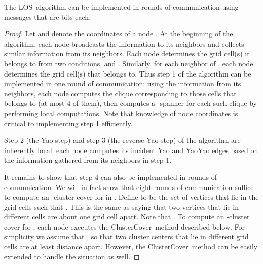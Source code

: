 \documentclass{llncs}
\newcommand{\alg}{{\sc LOS}}
\newcommand{\cc}{{\sc ClusterCover}}
\begin{document}
\begin{theorem}
The \alg\ algorithm can be implemented in  rounds of communication using messages that
are  bits each.
\label{thm:communication}
\end{theorem}
\begin{proof}
Let  and  denote the coordinates of a node . At the beginning of
the algorithm, each node  broadcasts the information 
to its neighbors and collects similar information from its neighbors.
Each node  determines the grid cell(s)  it belongs to from
two conditions, 
and
.
Similarly, for each neighbor  of , each node  determines the grid
cell(s) that  belongs to. Thus step 1 of the algorithm can be implemented
in one round of communication: using the information from its neighbors,
each node  computes the clique corresponding to those cells  that
 belongs to (at most 4 of them), then  computes a -spanner for each
such clique by performing local computations.
Note that knowledge of node coordinates is critical to implementing step 1
efficiently.

Step 2 (the Yao step) and step 3 (the reverse Yao step) of the algorithm
are inherently local: each node  computes its incident Yao and YaoYao
edges based on the information gathered from its neighbors in step 1.

It remains to show that step 4 can also be implemented in  rounds
of communication. We will in fact show that eight rounds of communication
suffice to compute an -cluster cover for  in .
Define  to be the set of vertices that lie in the grid cells  such
that . This is the same as saying that
two vertices that lie in different cells are about one grid cell apart.
Note that . To compute an -cluster cover for ,
each node  executes the \cc\ method described below. For
simplicity we assume that , so that two cluster centers that lie in different
grid cells are at least distance  apart. However, the \cc\ method
can be easily extended to handle the situation  as well.


\end{proof}
\end{document}
